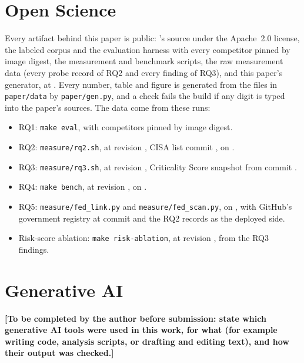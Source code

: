 

\section{Open Science}

Every artifact behind this paper is public: \tool{}'s source under the
Apache~2.0 license, the labeled corpus and the evaluation harness with every
competitor pinned by image digest, the measurement and benchmark scripts, the
raw measurement data (every probe record of RQ2 and every finding of RQ3),
and this paper's generator, at \artifactlink. Every number, table and figure is generated from the files in
\texttt{paper/data} by \texttt{paper/gen.py}, and a check fails the build if
any digit is typed into the paper's sources. The data come from these runs:
\begin{itemize}
\item RQ1: \texttt{make eval}, with competitors pinned by image digest.
\item RQ2: \texttt{measure/rq2.sh}, at \tool{} revision
  , CISA list commit
  \texttt{}, on .
\item RQ3: \texttt{measure/rq3.sh}, at revision
  , Criticality Score snapshot
   from commit
  \texttt{}.
\item RQ4: \texttt{make bench}, at revision ,
  on .
\item RQ5: \texttt{measure/\allowbreak fed\_link.py} and
  \texttt{measure/\allowbreak fed\_scan.py},
  on , with GitHub's government registry at commit
  \texttt{} and the RQ2 records as the deployed side.
\item Risk-score ablation: \texttt{make risk-ablation}, at revision
  , from the RQ3 findings.
\end{itemize}

\section{Generative AI}

\textbf{[To be completed by the author before submission: state which
generative AI tools were used in this work, for what (for example writing
code, analysis scripts, or drafting and editing text), and how their output
was checked.]}

